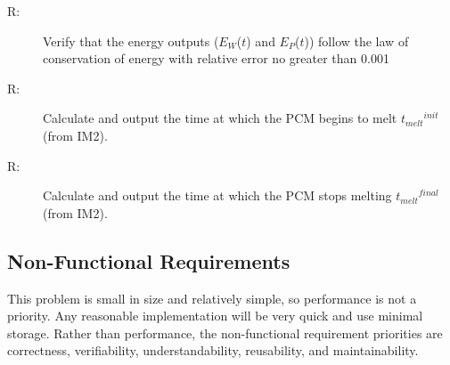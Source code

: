 \documentclass[12pt]{article}
\newcounter{reqnum}
\newcommand{\rthereqnum}{R\thereqnum}
\begin{document}
\begin{description}
\item[\rthereqnum\label{FR:Verify-Energy-Output-follow-Conservation-of-Energy}:]Verify that the energy outputs (${E_{W}}$($t$) and ${E_{P}}$($t$)) follow the law of conservation of energy with relative error no greater than 0.001%
\end{description}
\begin{description}
\item[\rthereqnum\label{FR:Calculate-PCM-melt-begin-time}:]Calculate and output the time at which the PCM begins to melt ${{t_{melt}}^{init}}$ (from IM2).
\end{description}
\begin{description}
\item[\rthereqnum\label{FR:Calculate-PCM-melt-end-time}:]Calculate and output the time at which the PCM stops melting ${{t_{melt}}^{final}}$ (from IM2).
\end{description}
\subsection{Non-Functional Requirements}
\label{Sec:NFRs}
This problem is small in size and relatively simple, so performance is not a priority. Any reasonable implementation will be very quick and use minimal storage. Rather than performance, the non-functional requirement priorities are correctness, verifiability, understandability, reusability, and maintainability.
\end{document}
